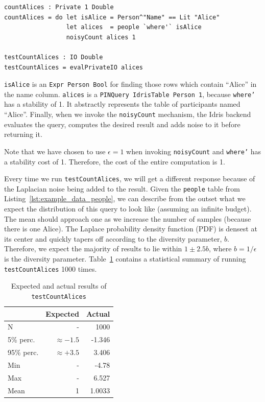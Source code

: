 \documentclass[12pt]{article}
\begin{document}
\begin{lstlisting}[caption={Counting Alices},label={lst:counting_alices}]
countAlices : Private 1 Double
countAlices = do let isAlice = Person^"Name" == Lit "Alice"
                 let alices  = people `where'` isAlice
                 noisyCount alices 1

testCountAlices : IO Double
testCountAlices = evalPrivateIO alices
\end{lstlisting}

\texttt{isAlice} is an \texttt{Expr Person Bool} for finding those rows which contain ``Alice'' in the name column.
\texttt{alices} is a \texttt{PINQuery IdrisTable Person 1}, because \texttt{where'} has a stability of 1.
It abstractly represents the table of participants named ``Alice''.
Finally, when we invoke the \texttt{noisyCount} mechanism, the Idris backend evaluates the query, computes the desired result and adds noise to it before returning it.

Note that we have chosen to use $\epsilon = 1$ when invoking \texttt{noisyCount} and \texttt{where'} has a stability cost of 1.
Therefore, the cost of the entire computation is 1.

Every time we run \texttt{testCountAlices}, we will get a different response because of the Laplacian noise being added to the result.
Given the \texttt{people} table from Listing~\ref{lst:example_data_people}, we can describe from the outset what we expect the distribution of this query to look like (assuming an infinite budget).
The mean should approach one as we increase the number of samples (because there is one Alice).
The Laplace probability density function (PDF) is densest at its center and quickly tapers off according to the diversity parameter, $b$.
Therefore, we expect the majority of results to lie within $1 \pm 2.5b$, where $b=1/\epsilon$ is the diversity parameter.
Table~\ref{tab:testCountAlices_results} contains a statistical summary of running \texttt{testCountAlices} 1000 times.

\begin{table}[h!]
  \caption{Expected and actual results of \texttt{testCountAlices}}
  \label{tab:testCountAlices_results}
  \centering

  \begin{tabular}{|l|rr|}
  \hline

  \hline
  \textbf{} & \textbf{Expected} & \textbf{Actual} \\
  \hline
    N          &             -  &   1000 \\
    5\% perc.  & $\approx -1.5$ & -1.346 \\
    95\% perc. & $\approx +3.5$ &  3.406 \\
    Min        &             -  &  -4.78 \\
    Max        &             -  &  6.527 \\
    Mean       &             1  & 1.0033 \\
  \hline

  \hline
  \end{tabular}
\end{table}
\end{document}
